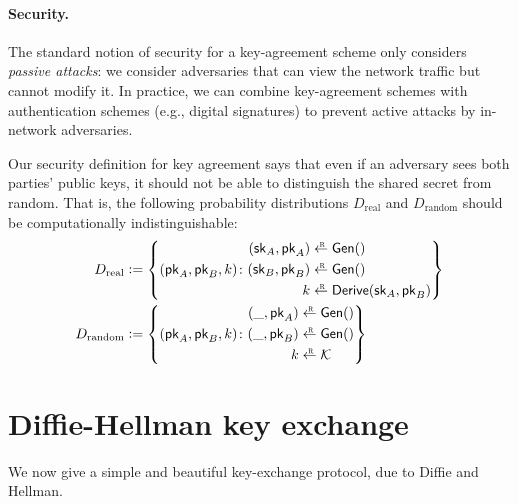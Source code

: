 \paragraph{Security.}
The standard notion of security for a key-agreement scheme
only considers \emph{passive attacks}:
we consider adversaries that can view the
network traffic but cannot modify it.
In practice, we can combine key-agreement
schemes with authentication schemes (e.g., digital signatures)
to prevent active attacks by in-network adversaries.

Our security definition for key agreement says that even
if an adversary sees both parties' public keys, it should
not be able to distinguish the shared secret from random.
That is, the following probability distributions
$D_\text{real}$ and $D_\text{random}$ should be 
computationally indistinguishable:
\begin{align*}
  D_\text{real} &\deq \left\{ 
(\pk_A, \pk_B, k) \colon  \begin{aligned}
  (\sk_A, \pk_A) &\getsr \Gen()\\
  (\sk_B, \pk_B) &\getsr \Gen()\\
  k &\getsr \Derive(\sk_A, \pk_B)
\end{aligned}
\right\} \\
  D_\text{random} &\deq \left\{ (\pk_A, \pk_B, k) \colon  \begin{aligned}
  (\_, \pk_A) &\getsr \Gen()\\
  (\_, \pk_B) &\getsr \Gen()\\
  k &\getsr \calK 
\end{aligned}
  \right\}
\end{align*}


\section{Diffie-Hellman key exchange}
We now give a simple and beautiful key-exchange protocol, 
due to Diffie and Hellman.

